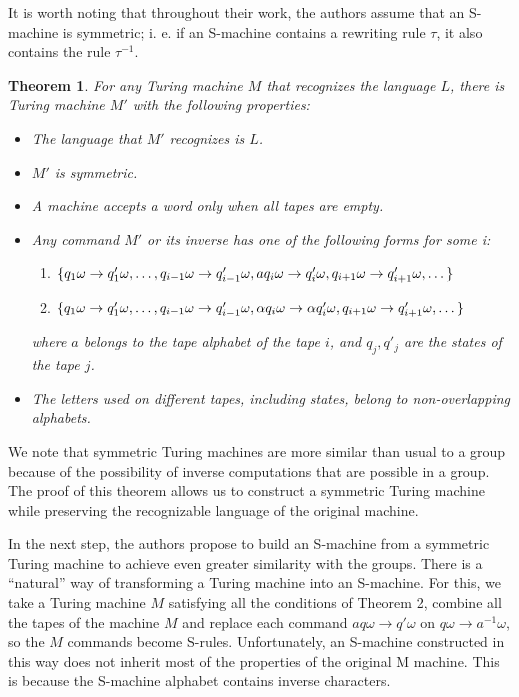 \documentclass[conference]{IEEEtran}
\newtheorem{thm}{Theorem}[section]
\theoremstyle{definition}
\begin{document}
It is worth noting that throughout their work, the authors assume that
an S-machine is symmetric; i. e. if an S-machine contains
a rewriting rule $\tau$, it also contains the rule $\tau^{-1}$.

\begin{thm} \label{thmTM}
For any Turing machine $ M $ that recognizes the language $ L $, there is
Turing machine $ M' $ with the following properties:
\begin{itemize}
\item The language that $ M'$ recognizes is $ L $.
\item $ M'$ is symmetric.
\item A machine accepts a word only when all tapes are empty.
\item Any command $ M' $ or its inverse has one of the following forms for some i:
\begin{enumerate}
\item $\{ q_1 \omega \to q'_1 \omega, \dots, q_{i-1} \omega \to q'_{i-1} \omega, \\
a q_i \omega \to q'_i \omega, q_{i+1} \omega \to q'_{i+1} \omega, \dots \}$
\item $\{q_1 \omega \to q'_1 \omega, \dots, q_{i-1} \omega \to q'_{i-1} \omega, \\
\alpha q_i \omega \to \alpha q'_i \omega, q_{i+1} \omega \to q'_{i+1} \omega, \dots \} $
\end{enumerate}
where $a$ belongs to the tape alphabet of the tape $i$, and $q_j, q'_j$ are the
states of the tape $j$.
\item The letters used on different tapes, including states, belong to non-overlapping alphabets.
\end{itemize}
\end{thm}

We note that symmetric Turing machines are more similar than usual to a group
because of the possibility of inverse computations that are possible in a group.
The proof of this theorem allows us to construct a symmetric Turing machine
while preserving the recognizable language of the original machine.

In the next step, the authors propose to build an S-machine from a symmetric
Turing machine to achieve even greater similarity with the groups.
There is a “natural” way of transforming a Turing machine into an S-machine.
For this, we take a Turing machine $ M $ satisfying all the conditions of Theorem 2,
combine all the tapes of the machine $ M $ and replace each command
$a q \omega \to q' \omega$
on $q \omega \to a^{- 1} \omega$, so the $ M $ commands become S-rules.
Unfortunately, an S-machine constructed in this way does not inherit most
of the properties of the original M machine. This is because the S-machine
alphabet contains inverse characters.
\end{document}
